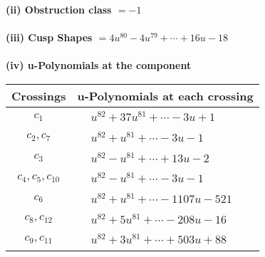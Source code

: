 \documentclass[1p]{elsarticle_modified}
\theoremstyle{definition}
\begin{document}
\flushleft \textbf{(ii) Obstruction class $= -1$}\\~\\
\flushleft \textbf{(iii) Cusp Shapes $= 4 u^{80}-4 u^{79}+\cdots+16 u-18$}\\~\\
\newpage\renewcommand{\arraystretch}{1}
\flushleft \textbf{(iv) u-Polynomials at the component}\newline \\
\begin{tabular}{m{50pt}|m{274pt}}
Crossings & \hspace{64pt}u-Polynomials at each crossing \\
\hline $$\begin{aligned}c_{1}\end{aligned}$$&$\begin{aligned}
&u^{82}+37 u^{81}+\cdots-3 u+1
\end{aligned}$\\
\hline $$\begin{aligned}c_{2},c_{7}\end{aligned}$$&$\begin{aligned}
&u^{82}+u^{81}+\cdots-3 u-1
\end{aligned}$\\
\hline $$\begin{aligned}c_{3}\end{aligned}$$&$\begin{aligned}
&u^{82}- u^{81}+\cdots+13 u-2
\end{aligned}$\\
\hline $$\begin{aligned}c_{4},c_{5},c_{10}\end{aligned}$$&$\begin{aligned}
&u^{82}- u^{81}+\cdots-3 u-1
\end{aligned}$\\
\hline $$\begin{aligned}c_{6}\end{aligned}$$&$\begin{aligned}
&u^{82}+u^{81}+\cdots-1107 u-521
\end{aligned}$\\
\hline $$\begin{aligned}c_{8},c_{12}\end{aligned}$$&$\begin{aligned}
&u^{82}+5 u^{81}+\cdots-208 u-16
\end{aligned}$\\
\hline $$\begin{aligned}c_{9},c_{11}\end{aligned}$$&$\begin{aligned}
&u^{82}+3 u^{81}+\cdots+503 u+88
\end{aligned}$\\
\hline
\end{tabular}\\~\\
\end{document}
